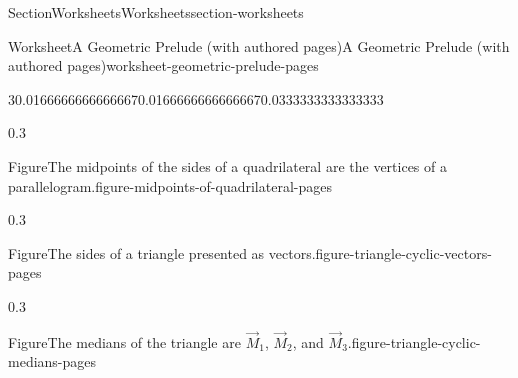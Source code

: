 \documentclass[oneside,10pt,]{article}
\numberwithin{equation}{section}
\begin{document}
\begin{sectionptx}{Section}{Worksheets}{}{Worksheets}{}{}{section-worksheets}
\begin{worksheet-subsection}{Worksheet}{A Geometric Prelude (with authored pages)}{}{A Geometric Prelude (with authored pages)}{}{}{worksheet-geometric-prelude-pages}
\begin{introduction}{}
\begin{sidebyside}{3}{0.0166666666666667}{0.0166666666666667}{0.0333333333333333}
\begin{sbspanel}{0.3}
\begin{panelfigureptx}{Figure}{The midpoints of the sides of a quadrilateral are the vertices of a parallelogram.}{figure-midpoints-of-quadrilateral-pages}{}
{\begin{tikzpicture}[xscale=0.8, yscale=0.8]
\end{tikzpicture}%
}%
\tcblower
\end{panelfigureptx}%
\end{sbspanel}%
\begin{sbspanel}{0.3}%
\begin{panelfigureptx}{Figure}{The sides of a triangle presented as vectors.}{figure-triangle-cyclic-vectors-pages}{}%
\noindent{}%
\tcblower
\end{panelfigureptx}%
\end{sbspanel}%
\begin{sbspanel}{0.3}%
\begin{panelfigureptx}{Figure}{The medians of the triangle are \(\vec{M}_1\), \(\vec{M}_2\), and \(\vec{M}_3\).}{figure-triangle-cyclic-medians-pages}{}%
\noindent{}
\end{panelfigureptx}
\end{sbspanel}
\end{sidebyside}
\end{introduction}
\end{worksheet-subsection}
\end{sectionptx}
\end{document}
